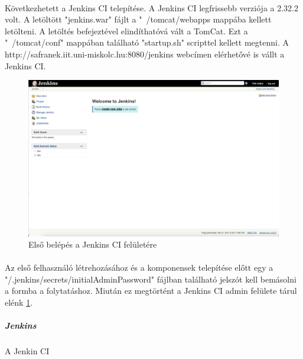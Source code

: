 \paragraph{}
Következhetett a Jenkins CI telepítése. A Jenkins CI legfrissebb verziója a 2.32.2 volt. 
A letöltött "jenkins.war" fájlt a "~/tomcat/webapps mappába kellett letölteni. 
A letöltés befejeztével elindíthatóvá vált a TomCat. 
Ezt a "~/tomcat/conf" mappában található "startup.sh" scripttel kellett megtenni. 
A http://safranek.iit.uni-miskolc.hu:8080/jenkins webcímen elérhetővé is vállt a Jenkins CI.

\begin{figure}[h]
	\centering
	\includegraphics[width=1\linewidth]{pics/clearjenkins}
	\caption{Első belépés a Jenkins CI felületére}
	\label{fig:clearjenkins}
\end{figure}

\paragraph{}
Az első felhasználó létrehozásához és a komponensek telepítése előtt egy a "/.jenkins/secrets/initialAdminPassword" fájlban található jelszót kell bemásolni a formba a folytatáshoz. 
Miután ez megtörtént a Jenkins CI admin felülete tárul elénk \ref{fig:clearjenkins}. 

\subparagraph{Jenkins}

A Jenkin CI 



